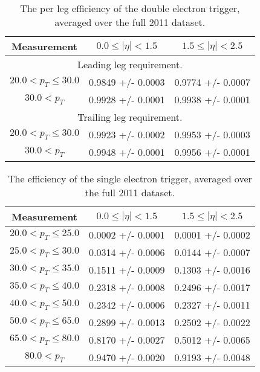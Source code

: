  \begin{table}[!ht]
 \begin{center}
 \begin{tabular}{|c|c|c|}
 \hline
 Measurement &  $  0.0  \le |\eta| <   1.5$ & $  1.5  \le |\eta| <   2.5$ \\
 \hline
\multicolumn{3}{c}{Leading leg requirement.} \\
\hline
$ 20.0 < p_{T} \le  30.0$ &     0.9849 +/- 0.0003  &      0.9774 +/- 0.0007 \\
\hline
$ 30.0 < p_{T} $ &     0.9928 +/- 0.0001  &      0.9938 +/- 0.0001 \\
\hline
\multicolumn{3}{c}{Trailing leg requirement.} \\
 \hline
$ 20.0 < p_{T} \le  30.0$ &     0.9923 +/- 0.0002  &      0.9953 +/- 0.0003 \\
\hline
$ 30.0 < p_{T} $ &     0.9948 +/- 0.0001  &      0.9956 +/- 0.0001 \\
\hline
\end{tabular}
\caption{The per leg efficiency of the double electron trigger, averaged over the full 2011 dataset.}
\label{tab:eff_trigger_doubleEle}
\end{center}
\end{table}

 \begin{table}[!ht]
 \begin{center}
 \begin{tabular}{|c|c|c|}
 \hline
 Measurement &  $  0.0  \le |\eta| <   1.5$ & $  1.5  \le |\eta| <   2.5$ \\
 \hline
$ 20.0 < p_{T} \le  25.0$ &     0.0002 +/- 0.0001  &      0.0001 +/- 0.0002 \\
\hline
$ 25.0 < p_{T} \le  30.0$ &     0.0314 +/- 0.0006  &      0.0144 +/- 0.0007 \\
\hline
$ 30.0 < p_{T} \le  35.0$ &     0.1511 +/- 0.0009  &      0.1303 +/- 0.0016 \\
\hline
$ 35.0 < p_{T} \le  40.0$ &     0.2318 +/- 0.0008  &      0.2496 +/- 0.0017 \\
\hline
$ 40.0 < p_{T} \le  50.0$ &     0.2342 +/- 0.0006  &      0.2327 +/- 0.0011 \\
\hline
$ 50.0 < p_{T} \le  65.0$ &     0.2899 +/- 0.0013  &      0.2502 +/- 0.0022 \\
\hline
$ 65.0 < p_{T} \le  80.0$ &     0.8170 +/- 0.0027  &      0.5012 +/- 0.0065 \\
\hline
$ 80.0 < p_{T} $ &     0.9470 +/- 0.0020  &      0.9193 +/- 0.0048 \\
\hline
\end{tabular}
\caption{The efficiency of the single electron trigger, averaged over the full 2011 dataset.}
\label{tab:eff_trigger_singleEle}
\end{center}
\end{table}

